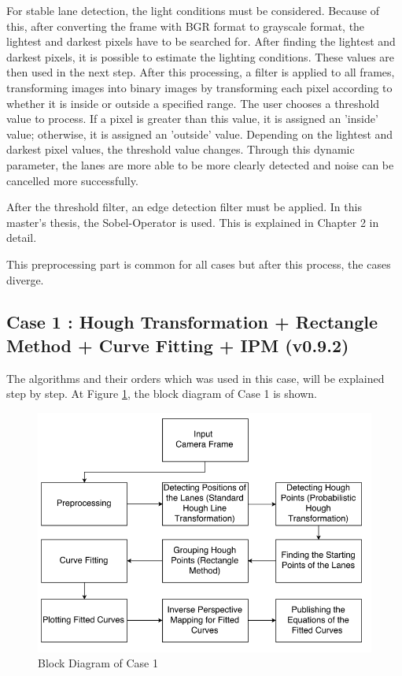 For stable lane detection, the light conditions must be considered. Because of this, after converting the frame with BGR format to grayscale format, the lightest and darkest pixels have to be searched for. After finding the lightest and darkest pixels, it is possible to estimate the lighting conditions. These values are then used in the next step. After this processing, a filter is applied to all frames, transforming images into binary images by transforming each pixel according to whether it is inside or outside a specified range. The user chooses a threshold value to process. If a pixel is greater than this value, it is assigned an 'inside' value; otherwise, it is assigned an 'outside' value. Depending on the lightest and darkest pixel values, the threshold value changes. Through this dynamic parameter, the lanes are more able to be more clearly detected and noise can be cancelled more successfully.

After the threshold filter, an edge detection filter must be applied. In this master's thesis, the Sobel-Operator is used. This is explained in Chapter 2 in detail.
 
This preprocessing part is common for all cases but after this process, the cases diverge. 
 
%
\subsection{Case 1 : Hough Transformation + Rectangle Method + Curve Fitting + IPM (v0.9.2)}\label{sec:Case 1}

The algorithms and their orders which was used in this case, will be explained step by step. At Figure \ref{fig:Case1_BlockDiagram}, the block diagram of Case 1 is shown.

\emph{\color{blue}}

\begin{figure}[H]
 \centering
  \includegraphics[width=1\textwidth]{./Bilder/Case1_BlockDiagram.png}		 \caption{Block Diagram of Case 1}
  \label{fig:Case1_BlockDiagram}
\end{figure}




